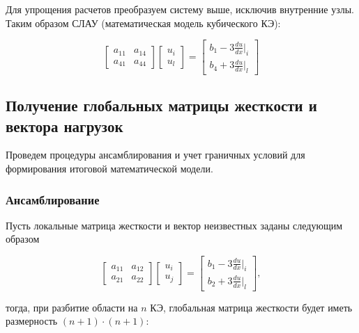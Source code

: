 Для упрощения расчетов преобразуем систему выше, исключив внутренние узлы. Таким образом СЛАУ (математическая модель кубического КЭ):

$$ \begin{bmatrix}
a_{11}     &   a_{14}\\
a_{41}     &    a_{44}
\end{bmatrix}
\begin{bmatrix}
u_i \\
u_l
\end{bmatrix} =
\begin{bmatrix}
b_1   -3  \frac{du}{dx}|_i \\
b_4   +3  \frac{du}{dx}|_l
\end{bmatrix}$$

\subsection{Получение глобальных матрицы жесткости и вектора нагрузок}

Проведем процедуры ансамблирования и учет граничных условий для формирования итоговой математической модели.

\subsubsection{Ансамблирование}

Пусть локальные матрица жесткости и вектор неизвестных заданы следующим образом

$$
\begin{bmatrix}
a_{11}     &   a_{12}\\
a_{21}     &    a_{22}
\end{bmatrix}
\begin{bmatrix}
u_i \\
u_j
\end{bmatrix} =
\begin{bmatrix}
b_1   -3  \frac{du}{dx}|_i \\
b_2   +3  \frac{du}{dx}|_l
\end{bmatrix},$$

тогда, при разбитие области на $n$ КЭ, глобальная матрица жесткости  будет иметь размерность $(n+1)\cdot(n+1)$:

